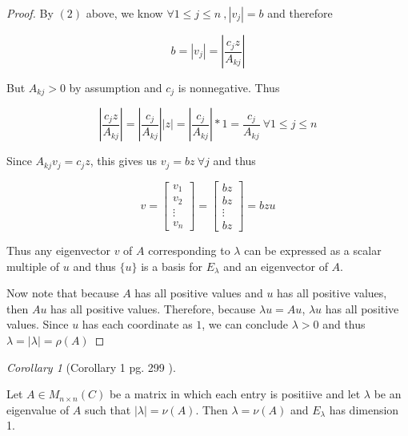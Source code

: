 \documentclass{amsart}
\theoremstyle{definition}
\theoremstyle{remark}
\newtheorem{corollary}{Corollary}[theorem]
\numberwithin{equation}{section}
\begin{document}
\begin{proof}
By $(2)$ above, we know $\forall  1 \leq j \leq n\ , |v_j| = b$ and therefore

$$b = |v_j| = |\frac{c_jz}{A_{kj}}|$$

But $A_{kj} > 0$ by assumption and $c_j$ is nonnegative.  Thus

$$ |\frac{c_jz}{A_{kj}}| = |\frac{c_j}{A_{kj}}||z| = |\frac{c_j}{A_{kj}}|*1 = \frac{c_j}{A_{kj}} \ \forall 1 \leq j \leq n$$

Since $A_{kj}v_j = c_j z$, this gives us $v_j = bz\ \forall j$ and thus 


\begin{equation}
    v = \begin{bmatrix}
           v_{1} \\
           v_{2} \\
           \vdots \\
           v_{n}
         \end{bmatrix}
     	= \begin{bmatrix}
           bz \\
           bz \\
           \vdots \\
           bz
         \end{bmatrix}
        = bzu 
\end{equation}

Thus any eigenvector $v$ of $A$ corresponding to $\lambda$ can be expressed as a scalar multiple of $u$ and thus $\{ u \}$ is a basis for $E_{\lambda}$ and an eigenvector of $A$.


Now note that because $A$ has all positive values and $u$ has all positive values, then $Au$ has all positive values. Therefore, because  $\lambda u = Au$, $\lambda u$ has all positive values.
Since $u$ has each coordinate as $1$, we can conclude $\lambda > 0$ and thus $\lambda = |\lambda| = \rho(A)$


\end{proof}

\begin{corollary}[Corollary 1 pg. 299 \cite{friedberg2003linear} ]\label{cor5181}

	Let $A \in M_{n \times n}(C)$ be a matrix in which each entry is positiive and let $\lambda$ be an eigenvalue of $A$ such that $|\lambda| = \nu(A)$.
	Then  $\lambda = \nu(A)$ and $E_{\lambda}$ has dimension 1. \newline

\end{corollary}
\end{document}
